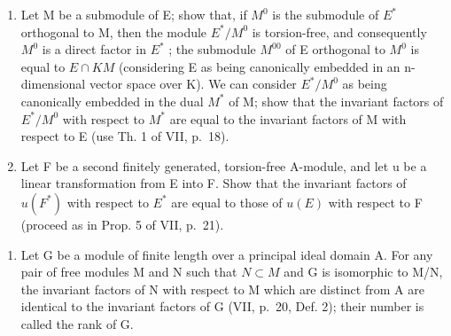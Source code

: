 \begin{enumerate}
\def\labelenumi{\alph{enumi})}
\item
  Let M be a submodule of E; show that, if \(M^{0}\) is the submodule of \(E^{*}\) orthogonal to M, then the module \(E^{*}/M^{0}\) is torsion-free, and consequently \(M^{0}\) is a direct factor in \(E^{*}\) ; the submodule \(M^{00}\) of E orthogonal to \(M^{0}\) is equal to \(E \cap KM\) (considering E as being canonically embedded in an n-dimensional vector space over K). We can consider \(E^{*}/M^{0}\) as being canonically embedded in the dual \(M^{*}\) of M; show that the invariant factors of \(E^{*}/M^{0}\) with respect to \(M^{*}\) are equal to the invariant factors of M with respect to E (use Th. 1 of VII, p.~18).
\item
  Let F be a second finitely generated, torsion-free A-module, and let u be a linear transformation from E into F. Show that the invariant factors of \(u(F^{*})\) with respect to \(E^{*}\) are equal to those of \(u(E)\) with respect to F (proceed as in Prop. 5 of VII, p.~21).
\end{enumerate}

\begin{enumerate}
\def\labelenumi{\arabic{enumi})}
\setcounter{enumi}{7}
\tightlist
\item
  Let G be a module of finite length over a principal ideal domain A. For any pair of free modules M and N such that \(N \subset M\) and G is isomorphic to M/N, the invariant factors of N with respect to M which are distinct from A are identical to the invariant factors of G (VII, p.~20, Def. 2); their number is called the rank of G.
\end{enumerate}

